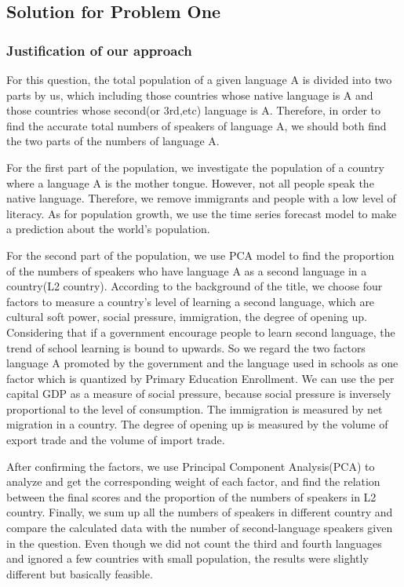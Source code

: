 	\subsection{Solution for Problem One} 
	 \subsubsection{Justification of our approach}                              
For this question, the total population of a given language A is divided into two parts by us, which including those countries whose native language is A and those countries whose second(or 3rd,etc) language is A. Therefore, in order to find the accurate total numbers of speakers of language A, we should both find the two parts of the numbers of language A.

For the first part of the population, we investigate the population of a country where a language A is the mother tongue. However, not all people speak the native language. Therefore, we remove immigrants and people with a low level of literacy. As for population growth, we use the time series forecast model to make a prediction about the world's population.

For the second part of the population, we use PCA model to find the proportion of the numbers of speakers who have language A as a second language in a country(L2 country). According to the background of the title, we choose four factors to measure a country's level of learning a second language, which are cultural soft power, social pressure, immigration, the degree of opening up. Considering that if a government encourage people to learn second language, the trend of school learning is bound to upwards. So we regard the two factors language A promoted by the government and the language used in schools as one factor which is quantized by Primary Education Enrollment. We can use the per capital GDP as a measure of social pressure, because social pressure is inversely proportional to the level of consumption. The immigration is measured by net migration in a country. The degree of opening up is measured by the volume of export trade and the volume of import trade.

After confirming the factors, we use Principal Component Analysis(PCA) to analyze and get the corresponding weight of each factor, and find the relation between the final scores and the proportion of the numbers of speakers in L2 country. Finally, we sum up all the numbers of speakers in different country and compare the calculated data with the number of second-language speakers given in the question. Even though we did not count the third and fourth languages and ignored a few countries with small population, the results were slightly different but basically feasible.



